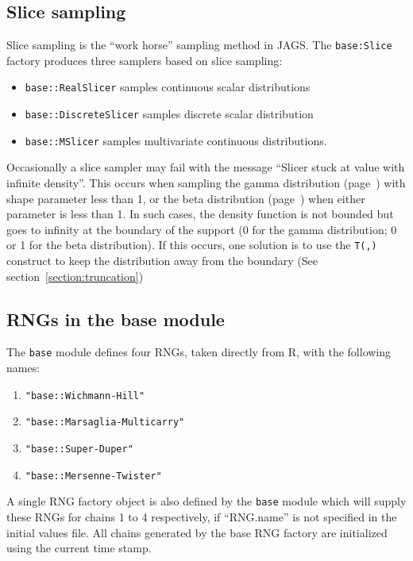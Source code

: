 \documentclass[11pt, a4paper, titlepage]{report}
\newcommand{\JAGS}{\textsf{JAGS}}
\newcommand{\R}{\textsf{R}}
\begin{document}
\subsection{Slice sampling}

Slice sampling \citep{Neal2003} is the ``work horse'' sampling method
in \JAGS. The \texttt{base:Slice} factory produces three samplers
based on slice sampling:
\begin{itemize}
\item \texttt{base::RealSlicer} samples continuous scalar
  distributions
\item \texttt{base::DiscreteSlicer} samples discrete scalar
  distribution
\item \texttt{base::MSlicer} samples multivariate continuous
  distributions.
\end{itemize}

Occasionally a slice sampler may fail with the message ``Slicer stuck
at value with infinite density''. This occurs when sampling the gamma
distribution (page~\pageref{bugs:dgamma}) with shape parameter less
than 1, or the beta distribution (page~\pageref{bugs:dbeta}) when
either parameter is less than 1.  In such cases, the density function
is not bounded but goes to infinity at the boundary of the support (0
for the gamma distribution; 0 or 1 for the beta distribution). If this
occurs, one solution is to use the \texttt{T(,)} construct to keep the
distribution away from the boundary (See section~\ref{section:truncation})

\subsection{RNGs in the base module}

The \texttt{base} module defines four RNGs, taken directly from \R,
with the following names:
\begin{enumerate}
\item \verb+"base::Wichmann-Hill"+
\item \verb+"base::Marsaglia-Multicarry"+
\item \verb+"base::Super-Duper"+
\item \verb+"base::Mersenne-Twister"+
\end{enumerate}

A single RNG factory object is also defined by the \texttt{base}
module which will supply these RNGs for chains 1 to 4 respectively, if
``RNG.name'' is not specified in the initial values file.  All chains
generated by the base RNG factory are initialized using the current
time stamp.
\end{document}

